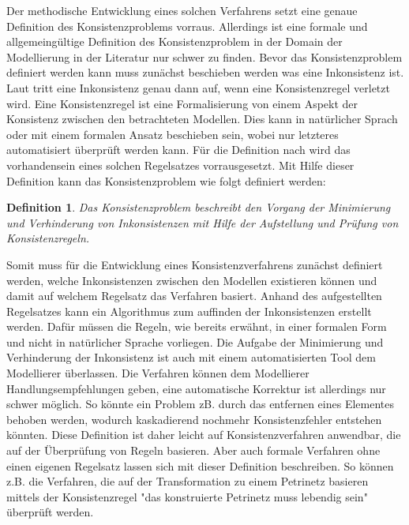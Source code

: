 Der methodische Entwicklung eines solchen Verfahrens setzt eine genaue Definition des Konsistenzproblems vorraus.
Allerdings ist eine formale und allgemeingültige Definition des Konsistenzproblem in der Domain der Modellierung in der Literatur nur schwer zu finden.
Bevor das Konsistenzproblem definiert werden kann muss zunächst beschieben werden was eine Inkonsistenz ist.
Laut \cite{Nuseibeh1996} tritt eine Inkonsistenz genau dann auf, wenn eine Konsistenzregel verletzt wird.
Eine Konsistenzregel ist eine Formalisierung von einem Aspekt der Konsistenz zwischen den betrachteten Modellen.
Dies kann in natürlicher Sprach oder mit einem formalen Ansatz beschieben sein, wobei nur letzteres automatisiert überprüft werden kann.
Für die Definition nach \cite{Nuseibeh1996} wird das vorhandensein eines solchen Regelsatzes vorrausgesetzt.
Mit Hilfe dieser Definition kann das Konsistenzproblem wie folgt definiert werden:

\newtheorem*{konsistenzproblem}{Definition}

\begin{konsistenzproblem}
    Das Konsistenzproblem beschreibt den Vorgang der Minimierung und Verhinderung von Inkonsistenzen mit Hilfe der Aufstellung und Prüfung von Konsistenzregeln.
\end{konsistenzproblem}

Somit muss für die Entwicklung eines Konsistenzverfahrens zunächst definiert werden, welche Inkonsistenzen zwischen den Modellen existieren können und damit auf welchem Regelsatz das Verfahren basiert.
Anhand des aufgestellten Regelsatzes kann ein Algorithmus zum auffinden der Inkonsistenzen erstellt werden.
Dafür müssen die Regeln, wie bereits erwähnt, in einer formalen Form und nicht in natürlicher Sprache vorliegen.
Die Aufgabe der Minimierung und Verhinderung der Inkonsistenz ist auch mit einem automatisierten Tool dem Modellierer überlassen.
Die Verfahren können dem Modellierer Handlungsempfehlungen geben, eine automatische Korrektur ist allerdings nur schwer möglich.
So könnte ein Problem zB. durch das entfernen eines Elementes behoben werden, wodurch kaskadierend nochmehr Konsistenzfehler entstehen könnten.
Diese Definition ist daher leicht auf Konsistenzverfahren anwendbar, die auf der Überprüfung von Regeln basieren.
Aber auch formale Verfahren ohne einen eigenen Regelsatz lassen sich mit dieser Definition beschreiben.
So können z.B. die Verfahren, die auf der Transformation zu einem Petrinetz basieren mittels der Konsistenzregel "das konstruierte Petrinetz muss lebendig sein" überprüft werden.


